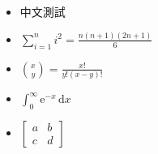 \begin{itemize}

\item 中文測試 

\item $\sum \limits_{i=1}^n i^2 = \frac{n(n+1)(2n+1)}{6}$

\item $ \binom{x}{y} = \frac{x!}{y!(x-y)!}$

\item $ {\int_0^\infty \mathrm{e}^{-x}\,\mathrm{d}x}$

\item $ {\begin{bmatrix}a & b \\c & d \end{bmatrix}}$

\end{itemize}